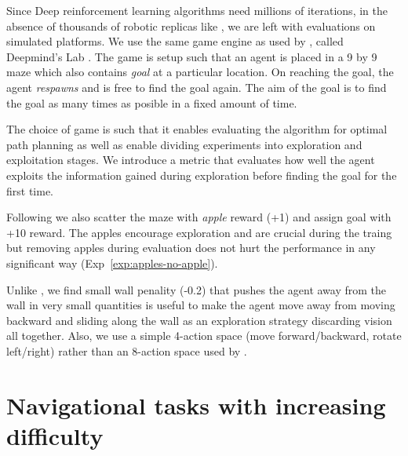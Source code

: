 Since Deep reinforcement learning algorithms need millions of iterations, in the absence of thousands of robotic replicas like \cite{LePaKrISER2017}, we are left with evaluations on simulated platforms.
We use the same game engine as used by \cite{MiPaViICLR2017}, called Deepmind's Lab \cite{BeLeTeARXIV2016}.
The game is setup such that an agent is placed in a 9 by 9 maze which also contains \emph{goal} at a particular location.
On reaching the goal, the agent \emph{respawns} and is free to find the goal again.
The aim of the goal is to find the goal as many times as posible in a fixed amount of time.

The choice of game is such that it enables evaluating the algorithm for optimal path planning as well as enable dividing experiments into exploration and exploitation stages.
We introduce a metric that evaluates how well the agent exploits the information gained during exploration before finding the goal for the first time.

Following \cite{MiPaViICLR2017} we also scatter the maze with \emph{apple} reward (+1) and assign goal with +10 reward.
The apples encourage exploration and are crucial during the traing but removing apples during evaluation does not hurt the performance in any significant way (Exp~\ref{exp:apples-no-apple}).

Unlike \cite{MiPaViICLR2017}, we find small wall penality (-0.2) that pushes the agent away from the wall in very small quantities is useful to make the agent move away from moving backward and sliding along the wall as an exploration strategy discarding vision all together.
Also, we use a simple 4-action space (move forward/backward, rotate left/right) rather than an 8-action space used by \cite{MiPaViICLR2017}.


\section{Navigational tasks with increasing difficulty}
\label{sec:navtasks}


